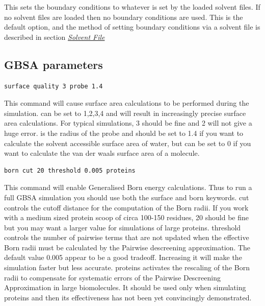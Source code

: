 \documentclass[letterpaper,10pt,english]{sphinxmanual}
\begin{document}
This sets the boundary conditions to whatever is set by the loaded solvent files. If no solvent files are loaded then no boundary conditions are used. This is the default option, and the method of setting boundary conditions via a solvent file is described in section {\hyperref[protoms:solventpdb]{\emph{Solvent File}}}


\subsection{GBSA parameters}
\label{protoms:gbsa-parameters}
\begin{Verbatim}[commandchars=\\\{\}]
surface quality 3 probe 1.4
\end{Verbatim}

This command will cause surface area calculations to be performed during the simulation.  can be set to 1,2,3,4 and will result in increasingly precise surface area calculations. For typical simulations, 3 should be fine and 2 will not give a huge error.  is the radius of the probe and should be set to 1.4 if you want to calculate the solvent accessible surface area of water, but can be set to 0 if you want to calculate the van der waals surface area of a molecule.

\begin{Verbatim}[commandchars=\\\{\}]
born cut 20 threshold 0.005 proteins
\end{Verbatim}

This command will enable Generalised Born energy calculations. Thus to run a full GBSA simulation you should use both the surface and born keywords. cut controls the cutoff distance for the computation of the Born radii. If you work with a medium sized protein scoop of circa 100-150 residues, 20 should be fine but you may want a larger value for simulations of large proteins. threshold controls the number of pairwise terms that are not updated when the effective Born radii must be calculated by the Pairwise descreening approximation. The default value
0.005 appear to be a good tradeoff. Increasing it will make the simulation faster but less accurate. proteins activates the rescaling of the Born radii to compensate for systematic errors of the Pairwise Descreening Approximation in large biomolecules. It should be used only when simulating proteins and then its effectiveness has not been yet
convincingly demonstrated.
\end{document}

